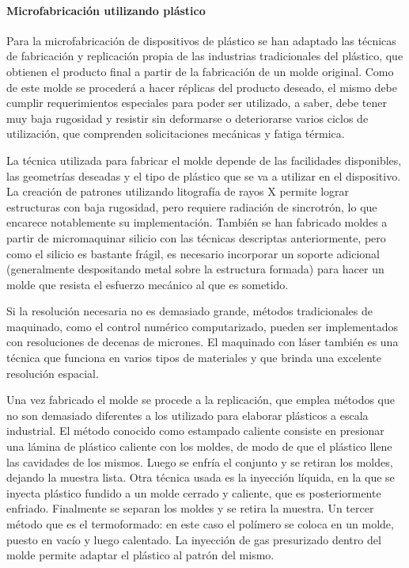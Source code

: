 \documentclass[a4paper, 12pt]{article}
\begin{document}
\paragraph*{Microfabricación utilizando plástico}
Para la microfabricación de dispositivos de plástico se han adaptado las técnicas de fabricación y replicación propia de las industrias tradicionales del plástico, que obtienen el producto final a partir de la fabricación de un molde original. Como de este molde se procederá a hacer réplicas del producto deseado, el mismo debe cumplir requerimientos especiales para poder ser utilizado, a saber, debe tener muy baja rugosidad y resistir sin deformarse o deteriorarse varios ciclos de utilización, que comprenden solicitaciones mecánicas y fatiga térmica.

La técnica utilizada para fabricar el molde depende de las facilidades disponibles, las geo\-me\-trí\-as deseadas y el tipo de plástico que se va a utilizar en el dispositivo. La creación de patrones utilizando litografía de rayos X permite lograr estructuras con baja rugosidad, pero requiere radiación de sincrotrón, lo que encarece notablemente su implementación. También se han fabricado moldes a partir de micromaquinar silicio con las técnicas descriptas anteriormente, pero como el silicio es bastante frágil, es necesario incorporar un soporte adicional (generalmente despositando metal sobre la estructura formada) para hacer un molde que resista el esfuerzo mecánico al que es sometido.

Si la resolución necesaria no es demasiado grande, métodos tradicionales de maquinado, como el control numérico computarizado, pueden ser implementados con resoluciones de decenas de micrones. El maquinado con láser también es una técnica que funciona en varios tipos de materiales y que brinda una excelente resolución espacial.

Una vez fabricado el molde se procede a la replicación, que emplea métodos que no son demasiado diferentes a los utilizado para elaborar plásticos a escala industrial. El método conocido como estampado caliente consiste en presionar una lámina de plástico caliente con los moldes, de modo de que el plástico llene las cavidades de los mismos. Luego se enfría el conjunto y se retiran los moldes, dejando la muestra lista. Otra técnica usada es la inyección líquida, en la que se inyecta plástico fundido a un molde cerrado y caliente, que es posteriormente enfriado. Finalmente se separan los moldes y se retira la muestra. Un tercer método que es el termoformado: en este caso el polímero se coloca en un molde, puesto en vacío y luego calentado. La inyección de gas presurizado dentro del molde permite adaptar el plástico al patrón del mismo.
\end{document}
